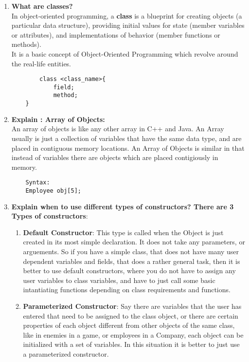 \documentclass[11pt]{article}
\begin{document}
\begin{enumerate}
	\item \textbf{What are classes?}\\

	In object-oriented programming, a \textbf{class} is a blueprint for creating objects (a particular data structure), providing initial values for state (member variables or attributes), and implementations of behavior (member functions or methods).
	\\ It is a basic concept of Object-Oriented Programming which revolve around the real-life entities. 
	
	\begin{verbatim}
		class <class_name>{  
			field;  
			method;  
  	}
	\end{verbatim}

	\item \textbf{ Explain : Array of Objects:} \\
 
	An array of objects is like any other array in C++ and Java. An Array usually is just a collection of variables that have the same data type, and are placed in contiguous memory locations. An Array of Objects is similar in that instead of variables there are objects which are placed contigiously in memory. 

	\begin{verbatim}
	Syntax: 
	Employee obj[5];
	\end{verbatim}
	\item \textbf{Explain when to use different types of constructors?
	There are 3 Types of constructors}: 
	\begin{enumerate}
		\item \textbf{Default Constructor}: This type is called when the Object is just created in its most simple declaration. 
		It does not take any parameters, or arguements. So if you have a simple class, that does not have many user dependent variables and fields, that does a rather general task, then it is better to use default constructors, where you do not have to assign any user variables to class variables, and have to just call some basic intantiating functions depending on class requirements and functions. 
		
		\item \textbf{Parameterized Constructor}: Say there are variables that the user has entered that need to be assigned to the class object, or there are certain properties of each object different from other objects of the same class, like in enemies in a game, or employees in a Company, each object can be initialized with a set of variables. In this situation it is better to just use a parameterized constructor. 
		

\end{enumerate}
\end{enumerate}
\end{document}
